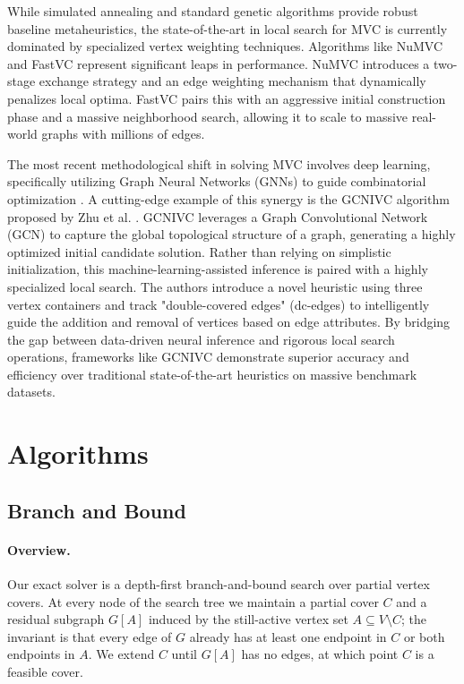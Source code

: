 \documentclass[sigconf]{acmart}
\begin{document}
While simulated annealing and standard genetic algorithms provide
robust baseline metaheuristics, the state-of-the-art in local search
for MVC is currently dominated by specialized vertex weighting
techniques. Algorithms like NuMVC \cite{cai2013numvc} and FastVC
\cite{cai2015fastvc} represent significant leaps in performance. NuMVC
introduces a two-stage exchange strategy and an edge weighting
mechanism that dynamically penalizes local optima. FastVC pairs this
with an aggressive initial construction phase and a massive
neighborhood search, allowing it to scale to massive real-world graphs
with millions of edges.

The most recent methodological shift in solving MVC involves deep
learning, specifically utilizing Graph Neural Networks (GNNs) to guide
combinatorial optimization \cite{khalil2017learning}. A cutting-edge
example of this synergy is the GCNIVC algorithm proposed by Zhu et al.
\cite{zhu_optimizing_mvc}. GCNIVC leverages a Graph Convolutional
Network (GCN) to capture the global topological structure of a graph,
generating a highly optimized initial candidate solution. Rather than
relying on simplistic initialization, this machine-learning-assisted
inference is paired with a highly specialized local search. The
authors introduce a novel heuristic using three vertex containers and
track "double-covered edges" (dc-edges) to intelligently guide the
addition and removal of vertices based on edge attributes. By bridging
the gap between data-driven neural inference and rigorous local search
operations, frameworks like GCNIVC demonstrate superior accuracy and
efficiency over traditional state-of-the-art heuristics on massive
benchmark datasets.

\section{Algorithms}
\label{sec:algorithms}

\subsection{Branch and Bound}
\label{sec:bnb}

\paragraph{Overview.} Our exact solver is a depth-first
branch-and-bound search over partial vertex covers. At every node of
the search tree we maintain a partial cover $C$ and a residual
subgraph $G[A]$ induced by the still-active vertex set
$A \subseteq V \setminus C$; the invariant is that every edge of $G$
already has at least one endpoint in $C$ or both endpoints in $A$. We
extend $C$ until $G[A]$ has no edges, at which point $C$ is a feasible
cover.
\end{document}
